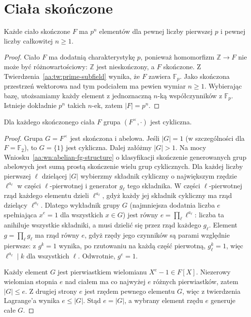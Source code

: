 \section{Ciała skończone}
\begin{twierdzenie}
\label{aa:tw:finite-field-cardinality}
Każde ciało skończone $F$ ma $p^n$ elementów
dla pewnej liczby pierwszej $p$ i pewnej liczby
całkowitej $n\ge1$.
\end{twierdzenie}
\begin{proof}
Ciało $F$ ma dodatnią charakterystykę $p$,
ponieważ homomorfizm $\mathbb Z\to F$ nie może być
różnowartościowy: $\mathbb Z$ jest nieskończony,
a $F$ skończone. Z
Twierdzenia~\ref{aa:tw:prime-subfield} wynika,
że $F$ zawiera $\mathbb F_p$. Jako skończona
przestrzeń wektorowa nad tym podciałem ma pewien
wymiar $n\ge1$. Wybierając bazę, utożsamiamy
każdy element z jednoznaczną $n$-ką współczynników
z $\mathbb F_p$. Istnieje dokładnie $p^n$ takich
$n$-ek, zatem $|F|=p^n$.
\end{proof}

\begin{twierdzenie}
\label{aa:tw:finite-field-multiplicative-cyclic}
Dla każdego skończonego ciała $F$ grupa
$(F^\times,\cdot)$ jest cykliczna.
\end{twierdzenie}
\begin{proof}
Grupa $G=F^\times$ jest skończona i abelowa.
Jeśli $|G|=1$ (w szczególności dla $F=\mathbb F_2$),
to $G=\{1\}$ jest cykliczna. Dalej załóżmy $|G|>1$.
Na mocy Wniosku~\ref{aa:wn:abelian-fg-structure}
o klasyfikacji skończenie generowanych grup abelowych
jest sumą
prostą skończenie wielu grup cyklicznych.
Dla każdej liczby pierwszej $\ell$ dzielącej $|G|$
wybierzmy składnik cykliczny o największym rzędzie
$\ell^{a_\ell}$ w części $\ell$-pierwotnej
i generator $g_\ell$ tego składnika. W części
$\ell$-pierwotnej rząd każdego elementu dzieli
$\ell^{a_\ell}$, gdyż każdy jej składnik cykliczny
ma rząd dzielący $\ell^{a_\ell}$. Dlatego
wykładnik grupy $G$ (najmniejsza dodatnia liczba $e$
spełniająca $x^e=1$ dla wszystkich $x\in G$) jest
równy $e=\prod_\ell\ell^{a_\ell}$: liczba ta
anihiluje wszystkie składniki, a musi dzielić się
przez rząd każdego $g_\ell$. Element
$g=\prod_\ell g_\ell$ ma rząd równy $e$, gdyż
rzędy jego czynników są parami względnie pierwsze:
z $g^k=1$ wynika, po rzutowaniu na każdą część
pierwotną, $g_\ell^k=1$, więc
$\ell^{a_\ell}\mid k$ dla wszystkich $\ell$.
Odwrotnie, $g^e=1$.

Każdy element $G$ jest pierwiastkiem wielomianu
$X^e-1\in F[X]$. Niezerowy wielomian stopnia $e$
nad ciałem ma co najwyżej $e$ różnych pierwiastków,
zatem $|G|\le e$. Z drugiej strony $e$ jest
rzędem pewnego elementu $G$, więc z twierdzenia
Lagrange'a wynika $e\le|G|$. Stąd $e=|G|$,
a wybrany element rzędu $e$ generuje całe $G$.
\end{proof}

